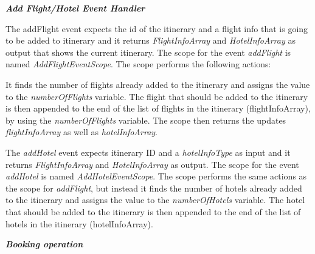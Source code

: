 \textbf{\textit{Add Flight/Hotel Event Handler}}

The addFlight event expects the id of the itinerary and a flight info that is going to be added to itinerary and it returns \textit{FlightInfoArray} and \textit{HotelInfoArray} as output that shows the current itinerary. The scope for the event \textit{addFlight} is named \textit{AddFlightEventScope}. The scope performs the following actions:
 
It finds the number of flights already added to the itinerary and assigns the value to the \textit{numberOfFlights} variable.
The flight that should be added to the itinerary is then appended to the end of the list of flights in the itinerary (flightInfoArray), by using the \textit{numberOfFlights} variable.
The scope then returns the updates \textit{flightInfoArray} as well as \textit{hotelInfoArray}.

The \textit{addHotel} event expects itinerary ID and a \textit{hotelInfoType} as input and it returns \textit{FlightInfoArray} and \textit{HotelInfoArray} as output. The scope for the event \textit{addHotel} is named \textit{AddHotelEventScope}. The scope performs the same actions as the scope for \textit{addFlight}, but instead it finds the number of hotels already added to the itinerary and assigns the value to the \textit{numberOfHotels} variable. The hotel that should be added to the itinerary is then appended to the end of the list of hotels in the itinerary (hotelInfoArray).   


\textbf{\textit{Booking operation}}

